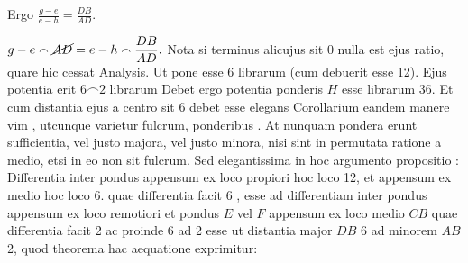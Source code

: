 \quad Ergo $\displaystyle\frac{g-e}{e-h}=\frac{DB}{AD}.$
\newline%
\noindent%
\rule[-3,5mm]{0mm}{0mm}%
$\displaystyle g - e \smallfrown \cancel{AD} = e - h \smallfrown \frac{DB}{AD}.$
\newline%
\indent%
Nota si terminus alicujus sit 0 nulla est ejus ratio, quare hic cessat Analysis.
\pend
\vspace{1.5em}
\pstart
Ut
pone
esse 6 librarum\protect{} (cum debuerit esse 12).
Ejus potentia\protect{} erit $6 \smallfrown 2$
 librarum
Debet ergo potentia ponderis $H$ esse librarum 36.
Et cum distantia ejus a centro sit 6 debet esse
elegans Corollarium eandem manere vim\protect{} ,
utcunque varietur fulcrum, ponderibus .
At nunquam pondera\protect{} erunt sufficientia,  vel justo majora, vel justo minora, nisi sint in permutata ratione  a medio, etsi in eo non sit fulcrum.\protect{}
Sed elegantissima in hoc argumento propositio : Differentia inter pondus  appensum ex loco propiori  hoc loco 12, et  appensum ex medio  hoc loco 6. quae differentia facit 6 , esse ad differentiam inter pondus  appensum ex loco remotiori  et  pondus $E$ vel $F$ appensum ex loco medio $CB$ quae differentia facit 2  ac proinde 6 ad 2 esse ut distantia major $DB$ 6 ad minorem $AB$ 2, quod theorema hac aequatione exprimitur:
